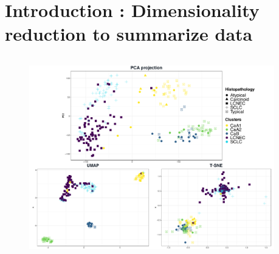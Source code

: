 \documentclass[compress]{beamer}
\begin{document}
\section{Introduction : Dimensionality reduction to summarize data}
\begin{frame}
\vspace*{-1cm}



    \begin{overprint}
\begin{columns}[t]
  \begin{column}{0.75\linewidth}
  \vspace*{-0.4cm}

  \begin{figure}
\centering
\includegraphics[height=0.75\linewidth]{figures/intro/RD3.pdf}
  \end{figure}
  \end{column}
  \hspace{-0.7cm}
  \begin{column}{0.25\linewidth}
  \end{column}
 \end{columns} 
 

\end{overprint}
\end{frame}
\end{document}
